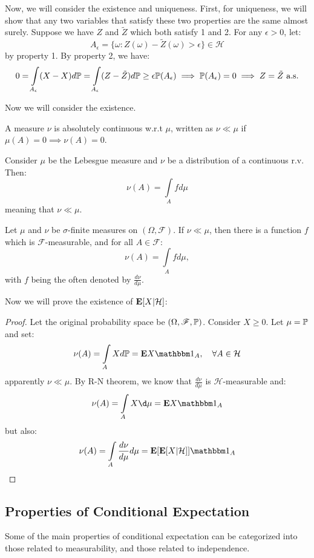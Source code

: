 \documentclass[../main/main.tex]{subfiles}
\begin{document}
Now, we will consider the existence and uniqueness. First, for uniqueness, we will show that any two variables that satisfy these two properties are the same almost surely. Suppose we have $Z$ and $\tilde{Z}$ which both satisfy 1 and  2. For any $\epsilon > 0$, let: \[
	A_\epsilon = \{\omega : Z(\omega) - \tilde{Z} (\omega) > \epsilon \} \in \mathcal{H}
\] by property 1. By property 2, we have: \[
	0 = \int\limits_{A_\epsilon} (X - X) d\P = \int\limits_{A_{\epsilon}} (Z - \tilde{Z}) d\P \geq \epsilon \P(A_{\epsilon}) \implies \P(A_{\epsilon}) = 0 \implies Z = \tilde{Z} \text{ a.s.}
\]

Now we will consider the existence.

\begin{definition}
	A measure $\nu$ is absolutely continuous w.r.t $\mu$, written as $\nu \ll \mu$ if $\mu(A) = 0 \implies \nu(A) = 0$.
\end{definition}

\begin{example}
	Consider $\mu$ be the Lebesgue measure and $\nu$ be a distribution of a continuous r.v. Then: \[
		\nu(A) = \int\limits_{A} f d\mu
	\] meaning that $\nu\ll \mu$.
\end{example}

\begin{theorem}
	Let $\mu$ and $\nu$ be $\sigma$-finite measures on $(\Omega, \mathscr{F})$. If $\nu \ll \mu$, then there is a function $f$ which is $\mathscr{F}$-measurable, and for all $A \in \mathscr{F}$: \[
		\nu(A) = \int\limits_{A} f d\mu,
	\] with $f$ being the  often denoted by $\frac{d \nu}{d \mu}$.
\end{theorem}
Now we will prove the existence of $\E[X | \mathcal{H}]$:
\begin{proof}
	Let the original probability space be $(\Omega, \mathscr{F} , \P)$.
	Consider $X \geq 0$. Let $\mu = \P$ and set: \[
		\nu(A) = \int\limits_{A} X d\P = \E X \ind_A , \quad \forall A \in \mathcal{H}
	\] apparently $\nu \ll \mu$. By R-N theorem, we know that $\frac{d \nu}{d \mu}$ is $\mathcal{H}$-measurable and: \[
		\nu(A) = \int\limits_{A} X \d \mu = \E X \ind_A
	\] but also: \[
		\nu(A) = \int\limits_{A} \frac{d \nu}{ d \mu} d \mu  = \E[\E[X|\mathcal{H}]]\ind_A
	\]
\end{proof}
\subsection{Properties of Conditional Expectation}
Some of the main properties of conditional expectation can be categorized into those related to measurability, and those related to independence.
\end{document}
